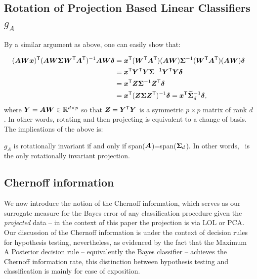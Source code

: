 \documentclass[10pt]{article}
\begin{document}
\subsection[]{Rotation of Projection Based Linear Classifiers $g_A$}

By a similar argument as above, one can easily show that:

\begin{align*}
(\bA  \bW \bx) \T  (\bA \bW  \bSig  \bW\T \bA\T)^{-1} \bA \bW \bdel
&= \bx\T (\bW\T \bA\T) (\bA \bW) \bSig^{-1} (\bW\T \bA\T) (\bA \bW) \bdel \\
&= \bx\T \bY\T \bY \bSig^{-1} \bY\T \bY \bdel \\
&= \bx\T \bZ \bSig^{-1} \bZ\T \bdel \\
&= \bx\T (\bZ \bSig \bZ\T)^{-1} \bdel = \bx\T \mt{\bSig}_d^{-1} \bdel,
\end{align*}
where $\bY = \bA \bW \in \Real^{d \times p}$ so that $\bZ=\bY\T \bY$ is a symmetric ${p \times p}$ matrix of rank $d$.  In other words, rotating and then projecting is equivalent to a change of basis.
The implications of the above is:
\begin{lem}
$g_A$ is rotationally invariant if and only if span($\bA$)=span($\bSig_d$).
In other words, \Pca~is the only rotationally invariant projection.
\end{lem}

\subsection{Chernoff information}
We now introduce the notion of the Chernoff information, which serves as our surrogate measure for the Bayes error of any classification procedure given the {\em projected} data -- in the context of this paper the projection is via LOL or PCA. Our discussion of the Chernoff information is under the context of decision rules for hypothesis testing, nevertheless, as evidenced by the fact that the Maximum A Posterior decision rule -- equivalently the Bayes classifier -- achieves the Chernoff information rate, this distinction between hypothesis testing and classification is mainly for ease of exposition.
\end{document}
